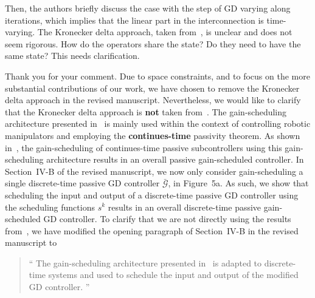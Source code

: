 \begin{rebuttal}
    {%
        Then, the authors briefly discuss the case with the step of GD varying along iterations, which implies that the linear part in the interconnection is time-varying. The Kronecker delta approach, taken from~\cite{Damaren_spr_gain_scheduling_1996}, is unclear and does not seem rigorous. How do the operators share the state? Do they need to have the same state? This needs clarification. 
    }%
    {%
        Thank you for your comment. Due to space constraints, and to focus on the more substantial contributions of our work, we have chosen to remove the Kronecker delta approach in the revised manuscript. Nevertheless, we would like to clarify that the Kronecker delta approach is \textbf{not} taken from~\cite{Damaren_spr_gain_scheduling_1996}. The gain-scheduling architecture presented in~\cite{Damaren_spr_gain_scheduling_1996} is mainly used within the context of controlling robotic manipulators and employing the \textbf{continues-time} passivity theorem. As shown in~\cite{Damaren_spr_gain_scheduling_1996}, the gain-scheduling of continues-time passive subcontrollers using this gain-scheduling architecture results in an overall passive gain-scheduled controller. In \mbox{Section~IV-B} of the revised manuscript, we now only consider gain-scheduling a single discrete-time passive GD controller \(\bar{\bm{\mathcal{G}}}\), in Figure~5a. As such, we show that scheduling the input and output of a discrete-time passive GD controller using the scheduling functions \(s^k\) results in an overall discrete-time passive gain-scheduled GD controller. To clarify that we are not directly using the results from~\cite{Damaren_spr_gain_scheduling_1996}, we have modified the opening paragraph of Section~IV-B in the revised manuscript to
        \begin{quote}\enquote{%
            The gain-scheduling architecture presented in~\cite{Damaren_spr_gain_scheduling_1996} is adapted to discrete-time systems and used to schedule the input and output of the modified GD controller.%
            }%
        \end{quote}
    }%
\end{rebuttal}
